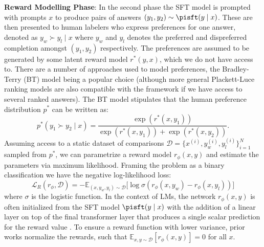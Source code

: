 \textbf{Reward Modelling Phase}: In the second phase the SFT model is prompted with prompts $x$ to produce pairs of answers $(y_1, y_2)\sim \pisft(y \mid x)$. These are then presented to human labelers who express preferences for one answer, denoted as $y_w\succ y_l \mid x$ where $y_w$ and $y_l$ denotes the preferred and dispreferred completion amongst $(y_1, y_2)$ respectively. The preferences are assumed to be generated by some latent reward model $r^*(y, x)$, which we do not have access to. There are a number of approaches used to model preferences, the Bradley-Terry (BT) \cite{bradley1952rankanalysis} model being a popular choice (although more general Plackett-Luce ranking models \citep{plackett1975analysis, luce2012individual} are also compatible with the framework if we have access to several ranked answers). The BT model stipulates that the human preference distribution $p^*$ can be written as:
\begin{equation}\label{eq:bradley-terry}
    p^*(y_1\succ y_2 \mid x)=\frac{\exp\left(r^*(x, y_1)\right)}{\exp\left(r^*(x, y_1)\right) + \exp\left(r^*(x, y_2)\right)}.
\end{equation}
Assuming access to a static dataset of comparisons $\mathcal{D}=\bigl\{x^{(i)}, y_w^{(i)}, y_l^{(i)}\bigr\}_{i=1}^N$ sampled from $p^*$, we can parametrize a reward model $r_{\phi}(x, y)$ and estimate the parameters via maximum likelihood. Framing the problem as a binary classification we have the negative log-likelihood loss:
\begin{equation}\label{eq:reward_model}
    \mathcal{L}_R(r_{\phi}, \mathcal{D}) = -\mathbb{E}_{(x, y_w, y_l)\sim \mathcal{D}}\bigl[\log \sigma(r_{\phi}(x, y_w)- r_{\phi}(x, y_l))\bigr]
\end{equation}
where $\sigma$ is the logistic function. In the context of LMs, the network $r_{\phi}(x, y)$ is often initialized from the SFT model $\pisft(y \mid x)$ with the addition of a linear layer on top of the final transformer layer that produces a single scalar prediction for the reward value \cite{ziegler2020finetuning}. To ensure a reward function with lower variance, prior works normalize the rewards, such that  $\mathbb{E}_{x,y\sim \mathcal{D}}\left[r_\phi(x, y)\right] = 0$ for all $x$.


